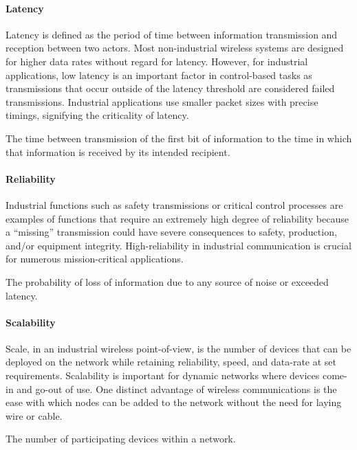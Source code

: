 \paragraph{Latency}
Latency is defined as the period of time between information transmission and reception between two actors.  Most non-industrial wireless systems are designed for higher data rates without regard for latency. However, for industrial applications, low latency is an important factor in control-based tasks as transmissions that occur outside of the latency threshold are considered failed transmissions. Industrial applications use smaller packet sizes with precise timings, signifying the criticality of latency.
\begin{definition}[Latency] \label{def:latency}
	The time between transmission of the first bit of information to the time in which that information is received by its intended recipient.
\end{definition}

\paragraph{Reliability}
Industrial functions such as safety transmissions or critical control processes are examples of functions that require an extremely high degree of reliability because a “missing” transmission could have severe consequences to safety, production, and/or equipment integrity. High-reliability in industrial communication is crucial for numerous mission-critical applications. 

\begin{definition}[Reliability] \label{def:reliability}
	The probability of loss of information due to any source of noise or exceeded latency.
\end{definition}

\paragraph{Scalability}
Scale, in an industrial wireless point-of-view, is the number of devices that can be deployed on the network while retaining reliability, speed, and data-rate at set requirements. Scalability is important for dynamic networks where devices come-in and go-out of use. One distinct advantage of wireless communications is the ease with which nodes can be added to the network without the need for laying wire or cable.
\begin{definition}[Scale] \label{def:scale}
	The number of participating devices within a network.
\end{definition}

